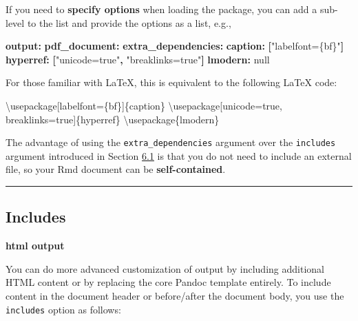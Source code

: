 \documentclass[
  a4paper,
  twoside,
  openright]{book}
\newenvironment{Shaded}{\begin{snugshade}}{\end{snugshade}}
\newcommand{\AttributeTok}[1]{\textcolor[rgb]{0.13,0.29,0.53}{#1}}
\newcommand{\BuiltInTok}[1]{#1}
\newcommand{\CharTok}[1]{\textcolor[rgb]{0.31,0.60,0.02}{#1}}
\newcommand{\ExtensionTok}[1]{#1}
\newcommand{\FunctionTok}[1]{\textcolor[rgb]{0.13,0.29,0.53}{\textbf{#1}}}
\newcommand{\KeywordTok}[1]{\textcolor[rgb]{0.13,0.29,0.53}{\textbf{#1}}}
\newcommand{\NormalTok}[1]{#1}
\newcommand{\StringTok}[1]{\textcolor[rgb]{0.31,0.60,0.02}{#1}}
\theoremstyle{definition}
\theoremstyle{definition}
\theoremstyle{definition}
\theoremstyle{definition}
\theoremstyle{remark}
\begin{document}
If you need to \textbf{specify options} when loading the package, you can add a sub-level to the list and provide the options as a list, e.g.,

\begin{Shaded}
\begin{Highlighting}[]
\FunctionTok{output}\KeywordTok{:}\AttributeTok{ }
\AttributeTok{  }\FunctionTok{pdf\_document}\KeywordTok{:}
\AttributeTok{    }\FunctionTok{extra\_dependencies}\KeywordTok{:}
\AttributeTok{      }\FunctionTok{caption}\KeywordTok{:}\AttributeTok{ }\KeywordTok{[}\StringTok{"labelfont=\{bf\}"}\KeywordTok{]}
\AttributeTok{      }\FunctionTok{hyperref}\KeywordTok{:}\AttributeTok{ }\KeywordTok{[}\StringTok{"unicode=true"}\KeywordTok{,}\AttributeTok{ }\StringTok{"breaklinks=true"}\KeywordTok{]}
\AttributeTok{      }\FunctionTok{lmodern}\KeywordTok{:}\AttributeTok{ }\CharTok{null}
\end{Highlighting}
\end{Shaded}

For those familiar with LaTeX, this is equivalent to the following LaTeX code:

\begin{Shaded}
\begin{Highlighting}[]
\BuiltInTok{\textbackslash{}usepackage}\NormalTok{[labelfont=\{bf\}]\{}\ExtensionTok{caption}\NormalTok{\} }
\BuiltInTok{\textbackslash{}usepackage}\NormalTok{[unicode=true, breaklinks=true]\{}\ExtensionTok{hyperref}\NormalTok{\}}
\BuiltInTok{\textbackslash{}usepackage}\NormalTok{\{}\ExtensionTok{lmodern}\NormalTok{\}}
\end{Highlighting}
\end{Shaded}

The advantage of using the \texttt{extra\_dependencies} argument over the \texttt{includes} argument introduced in Section \href{https://bookdown.org/yihui/rmarkdown-cookbook/latex-preamble.html\#latex-preamble}{6.1} is that you do not need to include an external file, so your Rmd document can be \textbf{self-contained}.

\begin{center}\rule{0.5\linewidth}{0.5pt}\end{center}

\subsection*{Includes}\label{includes}

\textbf{html output}

You can do more advanced customization of output by including additional HTML content or by replacing the core Pandoc template entirely. To include content in the document header or before/after the document body, you use the \texttt{includes} option as follows:
\end{document}
